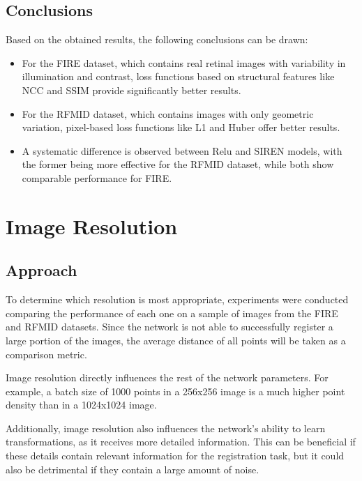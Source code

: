 \subsection{Conclusions}
\label{subsec:Conclusions-loss}

Based on the obtained results, the following conclusions can be drawn:
\begin{itemize}
    \item For the FIRE dataset, which contains real retinal images with variability in illumination and contrast, loss functions based on structural features like NCC and SSIM provide significantly better results.
    \item For the RFMID dataset, which contains images with only geometric variation, pixel-based loss functions like L1 and Huber offer better results.
    \item A systematic difference is observed between Relu and SIREN models, with the former being more effective for the RFMID dataset, while both show comparable performance for FIRE.
\end{itemize}

\section{Image Resolution}
\label{sec:Resolución da imaxe}

\subsection{Approach}
\label{subsec:Planteamento-resolution}

To determine which resolution is most appropriate, experiments were conducted comparing the performance of each one on a sample of images from the FIRE and RFMID datasets.
Since the network is not able to successfully register a large portion of the images, the average distance of all points will be taken as a comparison metric.

Image resolution directly influences the rest of the network parameters.
For example, a batch size of 1000 points in a 256x256 image is a much higher point density than in a 1024x1024 image.

Additionally, image resolution also influences the network's ability to learn transformations, as it receives more detailed information.
This can be beneficial if these details contain relevant information for the registration task, but it could also be detrimental if they contain a large amount of noise.

